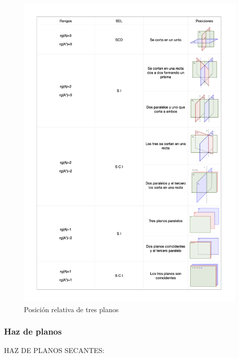 	\begin{figure}[]
		\centering
		\includegraphics[width=1.1\textwidth]{imagenes/imagenes10/T10IM12.png}
		\caption*{Posición relativa de tres planos}
 	\end{figure}

\subsubsection{Haz de planos}

\noindent 	HAZ DE PLANOS SECANTES:

